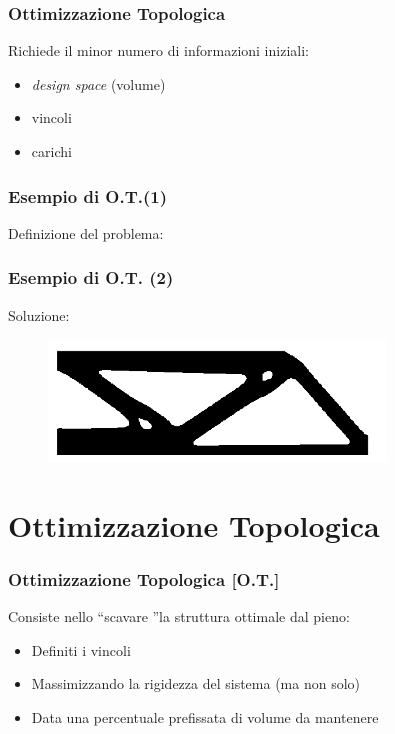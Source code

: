 \documentclass{beamer}
\begin{document}
\begin{frame}
	\frametitle{Ottimizzazione Topologica}
	Richiede il minor numero di informazioni iniziali:
	\begin{itemize}
		\item \textit{design space} (volume)
		\item vincoli
		\item carichi
	\end{itemize}
\end{frame}

\begin{frame}
	\frametitle{Esempio di O.T.(1)}
	Definizione del problema:
	\label{fig:schema_to}

\end{frame}


\begin{frame}
	\frametitle{Esempio di O.T. (2)}
	Soluzione:
	\begin{figure}
		\centering
		\includegraphics[width=0.8\textwidth]{./images/beam_2d_reci_gsf_fine_100.png}
		\label{fig:sol_to}
	\end{figure}
\end{frame}


\section{Ottimizzazione Topologica}

\begin{frame}
	\frametitle{Ottimizzazione Topologica [O.T.]}
	Consiste nello \textquotedblleft scavare \textquotedblright la struttura ottimale dal pieno:
	\begin{itemize}
		\item Definiti i vincoli
		\item Massimizzando la rigidezza del sistema (ma non solo)
		\item Data una percentuale prefissata di volume da mantenere 
	\end{itemize}
\end{frame}
\end{document}
